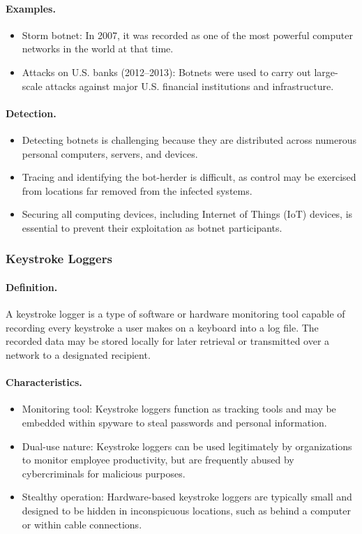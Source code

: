 \paragraph{Examples.}
\begin{itemize}
  \item Storm botnet: In 2007, it was recorded as one of the most powerful computer networks in the world at that time.
  \item Attacks on U.S. banks (2012--2013): Botnets were used to carry out large-scale attacks against major U.S. financial institutions and infrastructure.
\end{itemize}

\paragraph{Detection.}
\begin{itemize}
  \item Detecting botnets is challenging because they are distributed across numerous personal computers, servers, and devices.
  \item Tracing and identifying the bot-herder is difficult, as control may be exercised from locations far removed from the infected systems.
  \item Securing all computing devices, including Internet of Things (IoT) devices, is essential to prevent their exploitation as botnet participants.
\end{itemize}

\subsubsection{Keystroke Loggers}

\paragraph{Definition.}
A keystroke logger is a type of software or hardware monitoring tool capable of recording every keystroke a user makes on a keyboard into a log file. The recorded data may be stored locally for later retrieval or transmitted over a network to a designated recipient.

\paragraph{Characteristics.}
\begin{itemize}
  \item Monitoring tool: Keystroke loggers function as tracking tools and may be embedded within spyware to steal passwords and personal information.
  \item Dual-use nature: Keystroke loggers can be used legitimately by organizations to monitor employee productivity, but are frequently abused by cybercriminals for malicious purposes.
  \item Stealthy operation: Hardware-based keystroke loggers are typically small and designed to be hidden in inconspicuous locations, such as behind a computer or within cable connections.
\end{itemize}

